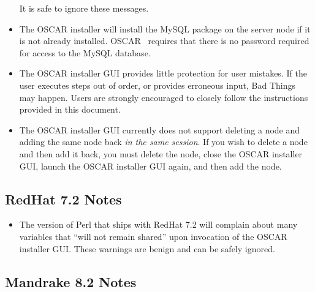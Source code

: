 \begin{itemize}
  It is safe to ignore these messages.
  
\item The OSCAR installer will install the MySQL package on the server
  node if it is not already installed.  OSCAR \oscarversion\ requires
  that there is no password required for  access to the
  MySQL database.
  
\item The OSCAR installer GUI provides little protection for user
  mistakes.  If the user executes steps out of order, or provides
  erroneous input, Bad Things may happen.  Users are strongly
  encouraged to closely follow the instructions provided in this
  document.

\item The OSCAR installer GUI currently does not support deleting a
  node and adding the same node back {\em in the same session}.  If
  you wish to delete a node and then add it back, you must delete the
  node, close the OSCAR installer GUI, launch the OSCAR installer GUI
  again, and then add the node.

\end{itemize}


\subsection{RedHat 7.2 Notes}
\label{subsec:rh72notes}

\begin{itemize}
\item The version of Perl that ships with RedHat 7.2 will complain
  about many variables that ``will not remain shared'' upon invocation
  of the OSCAR installer GUI.  These warnings are benign and can be
  safely ignored.
\end{itemize}


\subsection{Mandrake 8.2 Notes}
\label{subsec:mdk82notes}

